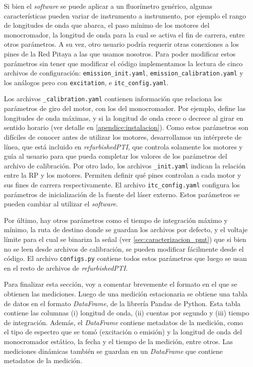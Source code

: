 Si bien el \textit{software} se puede aplicar a un fluorímetro genérico, algunas características pueden variar de instrumento a instrumento, por ejemplo el rango de longitudes de onda que abarca, el paso mínimo de los motores del monocromador, la longitud de onda para la cual se activa el fin de carrera, entre otros parámetros.
A su vez, otro usuario podría requerir otras conexiones a los pines de la Red Pitaya a las que usamos nosotros.
Para poder modificar estos parámetros sin tener que modificar el código implementamos la lectura de cinco archivos de configuración: \texttt{emission\_init.yaml}, \texttt{emission\_calibration.yaml} y los análogos pero con \texttt{excitation}, e \texttt{itc\_config.yaml}.

Los archivos \texttt{\_calibration.yaml} contienen información que relaciona los parámetros de giro del motor, con los del monocromador. 
Por ejemplo, define las longitudes de onda máximas, y si la longitud de onda crece o decrece al girar en sentido horario (ver detalle en \ref{apendice:instalacion}).
Como estos parámetros son difíciles de conocer antes de utilizar los motores, desarrollamos un intérprete de línea, que está incluido en \textit{refurbishedPTI}, que controla solamente los motores y guía al usuario para que pueda completar los valores de los parámetros del archivo de calibración.
Por otro lado, los archivos \texttt{\_init.yaml} indican la relación entre la RP y los motores.
Permiten definir qué pines controlan a cada motor y sus fines de carrera respectivamente.
El archivo \texttt{itc\_config.yaml} configura los parámetros de inicialización de la fuente del láser externo.
Estos parámetros se pueden cambiar al utilizar el \textit{software}.

Por último, hay otros parámetros como el tiempo de integración máximo y mínimo, la ruta de destino donde se guardan los archivos por defecto, y el voltaje límite para el cual se binariza la señal (ver \ref{sec:caracterizacion_pmt}) que si bien no se leen desde archivos de calibración, se pueden modificar fácilmente desde el código.
El archivo \texttt{configs.py} contiene todos estos parámetros que luego se usan en el resto de archivos de \textit{refurbishedPTI}.

Para finalizar esta sección, voy a comentar brevemente el formato en el que se obtienen las mediciones.
Luego de una medición estacionaria se obtiene una tabla de datos en el formato \textit{DataFrame}, de la librería Pandas de Python.
Esta tabla contiene las columnas (i) longitud de onda, (ii) cuentas por segundo y (iii) tiempo de integración.
Además, el \textit{DataFrame} contiene metadatos de la medición, como el tipo de espectro que se tomó (excitación o emisión) y la longitud de onda del monocromador estático, la fecha y el tiempo de la medición, entre otros.
Las mediciones dinámicas también se guardan en un \textit{DataFrame} que contiene metadatos de la medición.


